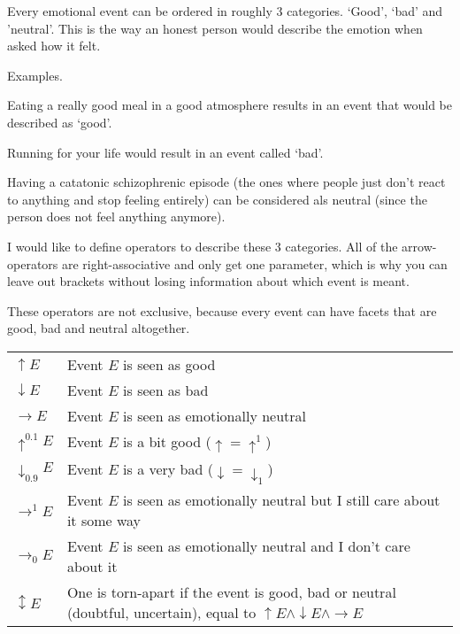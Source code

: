 \documentclass{scrartcl}
\begin{document}
Every emotional event can be ordered in roughly 3 categories. `Good', `bad' and 'neutral'. This is the way an honest
person would describe the emotion when asked how it felt. 

Examples.

Eating a really good meal in a good atmosphere results in an event that would be described as `good'. 

Running for your life would result in an event called `bad'.

Having a catatonic schizophrenic episode (the ones where people just don't react to anything and stop feeling entirely)
can be considered als neutral (since the person does not feel anything anymore).

I would like to define operators to describe these 3 categories. All of the arrow-operators are right-associative and
only get one parameter, which is why you can leave out brackets without losing information about which event is meant.

These operators are not exclusive, because every event can have facets that are good, bad and neutral altogether.

\begin{tabular}{l|l}
	$\uparrow E$ & Event $E$ is seen as good \\
	$\downarrow E$ & Event $E$ is seen as bad \\
	$\rightarrow E$ & Event $E$ is seen as emotionally neutral \\
	$\uparrow^{0.1} E$ & Event $E$ is a bit good ($\uparrow = \uparrow^1$) \\
	$\downarrow_{0.9} E$ & Event $E$ is a very bad ($\downarrow = \downarrow_1$) \\
	$\rightarrow^{1} E$ & Event $E$ is seen as emotionally neutral but I still care about it some way\footnotemark \\
	$\rightarrow_{0} E$ & Event $E$ is seen as emotionally neutral and I don't care about it\footnotemark\\
	$\updownarrow E$ & One is torn-apart if the event is good, bad or neutral (doubtful, uncertain), equal to $\uparrow E \wedge \downarrow E \wedge \rightarrow E$
\end{tabular}

\end{document}
